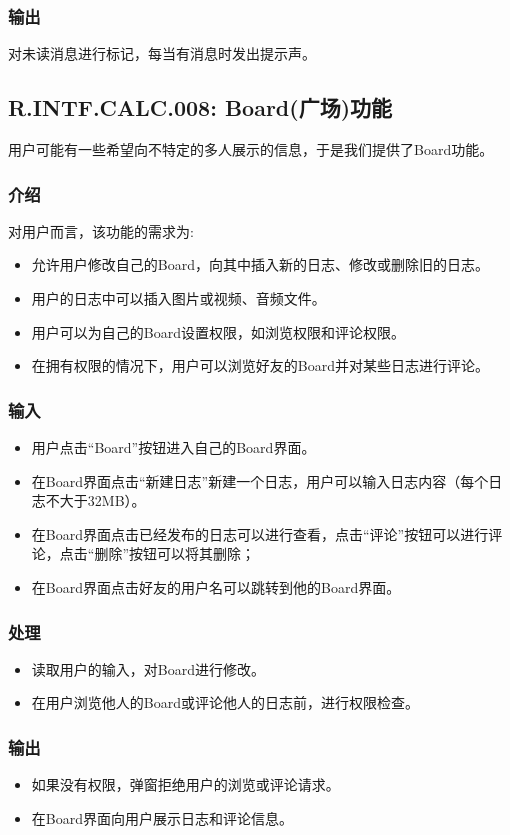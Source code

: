 \subsubsection{输出}
对未读消息进行标记，每当有消息时发出提示声。

\subsection{R.INTF.CALC.008: Board(广场)功能}
用户可能有一些希望向不特定的多人展示的信息，于是我们提供了Board功能。
\subsubsection{介绍}
对用户而言，该功能的需求为:
\begin{itemize}
  \item 允许用户修改自己的Board，向其中插入新的日志、修改或删除旧的日志。
  \item 用户的日志中可以插入图片或视频、音频文件。
  \item 用户可以为自己的Board设置权限，如浏览权限和评论权限。
  \item 在拥有权限的情况下，用户可以浏览好友的Board并对某些日志进行评论。
\end{itemize}
\subsubsection{输入}
\begin{itemize}
  \item 用户点击“Board”按钮进入自己的Board界面。
  \item 在Board界面点击“新建日志”新建一个日志，用户可以输入日志内容（每个日志不大于32MB）。
  \item 在Board界面点击已经发布的日志可以进行查看，点击“评论”按钮可以进行评论，点击“删除”按钮可以将其删除；
  \item 在Board界面点击好友的用户名可以跳转到他的Board界面。
\end{itemize}

\subsubsection{处理}
\begin{itemize}
  \item 读取用户的输入，对Board进行修改。
  \item 在用户浏览他人的Board或评论他人的日志前，进行权限检查。
\end{itemize}
\subsubsection{输出}
\begin{itemize}
  \item 如果没有权限，弹窗拒绝用户的浏览或评论请求。
  \item 在Board界面向用户展示日志和评论信息。
\end{itemize}

